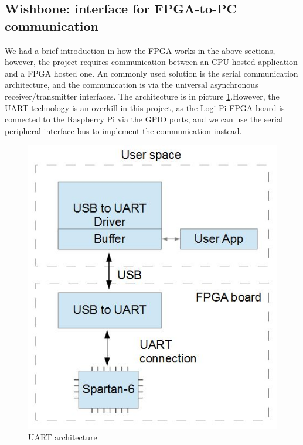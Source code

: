 \documentclass[11pt,openright,a4paper]{report}
\begin{document}
\subsection{Wishbone: interface for FPGA-to-PC communication}
We had a brief introduction in how the FPGA works in the above sections, however, the project requires communication between an CPU hosted application and a FPGA hosted one. An commonly used solution is the serial communication architecture, and the communication is via the universal asynchronous receiver/transmitter interfaces\cite{michael1992universal}. The architecture is in picture \ref{fig:uart}.However, the UART technology is an overkill in this project, as the Logi Pi FPGA board is connected to the Raspberry Pi via the GPIO ports, and we can use the serial peripheral interface bus to implement the communication instead.\\
\begin{figure}[H]
	\centering
	\includegraphics[width=0.5\linewidth]{picture/uart}
	\caption{UART architecture}
	\label{fig:uart}
\end{figure}
\end{document}
